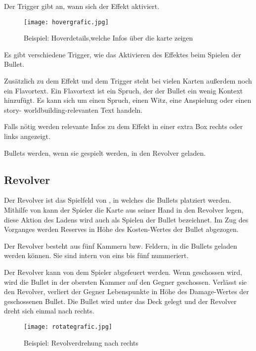 Der Trigger gibt an, wann sich der Effekt aktiviert.


\begin{figure}[H]
    \centering
    \texttt{[image: hovergrafic.jpg]}
    \caption{Beispiel: Hoverdetails,welche Infos über die karte zeigen}
\end{figure}



Es gibt verschiedene Trigger, wie \zB das Aktivieren des Effektes beim Spielen der Bullet.


Zusätzlich zu dem Effekt und dem Trigger steht bei vielen Karten außerdem noch ein Flavortext.
Ein Flavortext ist ein Spruch, der der Bullet ein wenig Kontext hinzufügt.
Es kann sich um einen Spruch, einen Witz, eine Anspielung oder einen story- \bzw worldbuilding-relevanten Text handeln.


Falls nötig werden relevante Infos zu dem Effekt in einer extra Box rechts oder links angezeigt.


Bullets werden, wenn sie gespielt werden, in den Revolver geladen.


\subsection{Revolver}\label{der_revolver}

Der Revolver ist das Spielfeld von \FF, in welches die Bullets platziert \bzw {} werden.
Mithilfe von  kann der Spieler die Karte aus seiner Hand in den Revolver legen, diese Aktion des Ladens wird auch als Spielen der Bullet bezeichnet.
Im Zug des Vorganges werden Reserves in Höhe des Kosten-Wertes der Bullet abgezogen.


Der Revolver besteht aus fünf Kammern bzw. Feldern, in die Bullets geladen werden können.
Sie sind intern von eins bis fünf nummeriert.


Der Revolver kann von dem Spieler abgefeuert werden. Wenn geschossen wird, wird die Bullet in der obersten Kammer auf den Gegner geschossen.
Verlässt sie den Revolver, verliert der Gegner Lebenspunkte in Höhe des Damage-Wertes der geschossenen Bullet.
Die Bullet wird unter das Deck gelegt und der Revolver dreht sich einmal nach rechts.

\begin{figure}[H]
    \centering
    \texttt{[image: rotategrafic.jpg]}
    \caption{Beispiel: Revolverdrehung nach rechts}
\end{figure}


